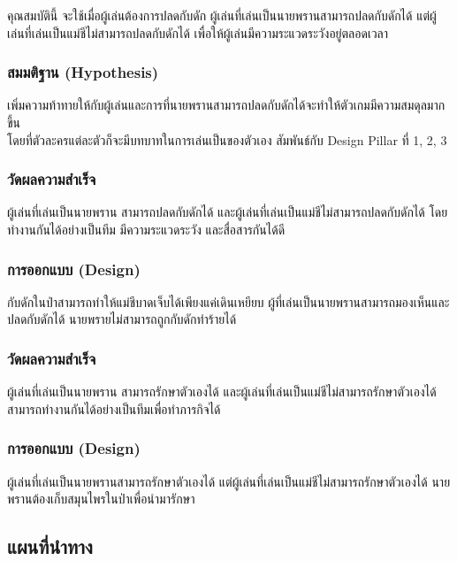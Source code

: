 คุณสมบัตินี้ จะใช้เมื่อผู้เล่นต้องการปลดกับดัก ผู้เล่นที่เล่นเป็นนายพรานสามารถปลดกับดักได้ แต่ผู้เล่นที่เล่นเป็นแม่ชีไม่สามารถปลดกับดักได้ เพื่อให้ผู้เล่นมีความระแวดระวังอยู่ตลอดเวลา

\subsubsection{สมมติฐาน (Hypothesis)}

เพิ่มความท้าทายให้กับผู้เล่นและการที่นายพรานสามารถปลดกับดักได้จะทำให้ตัวเกมมีความสมดุลมากขึ้น \\ โดยที่ตัวละครแต่ละตัวก็จะมีบทบาทในการเล่นเป็นของตัวเอง สัมพันธ์กับ Design Pillar ที่ 1, 2, 3

\subsubsection{วัดผลความสำเร็จ}

ผู้เล่นที่เล่นเป็นนายพราน สามารถปลดกับดักได้ และผู้เล่นที่เล่นเป็นแม่ชีไม่สามารถปลดกับดักได้ โดยทำงานกันได้อย่างเป็นทีม มีความระแวดระวัง และสื่อสารกันได้ดี

\subsubsection{การออกแบบ (Design)}

กับดักในป่าสามารถทำให้แม่ชีบาดเจ็บได้เพียงแค่เดินเหยียบ ผู้ที่เล่นเป็นนายพรานสามารถมองเห็นและปลดกับดักได้ นายพรายไม่สามารถถูกกับดักทำร้ายได้

\subsubsection{วัดผลความสำเร็จ}

ผู้เล่นที่เล่นเป็นนายพราน สามารถรักษาตัวเองได้ และผู้เล่นที่เล่นเป็นแม่ชีไม่สามารถรักษาตัวเองได้ สามารถทำงานกันได้อย่างเป็นทีมเพื่อทำภารกิจได้

\subsubsection{การออกแบบ (Design)}

ผู้เล่นที่เล่นเป็นนายพรานสามารถรักษาตัวเองได้ แต่ผู้เล่นที่เล่นเป็นแม่ชีไม่สามารถรักษาตัวเองได้
นายพรานต้องเก็บสมุนไพรในป่าเพื่อนำมารักษา

\subsection{แผนที่นำทาง}

